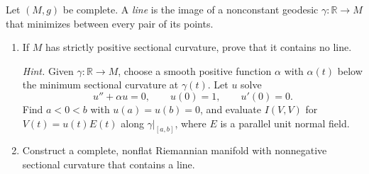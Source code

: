 \begin{exercise}
\label{prob:complete-lines-sectional-curvature}

Let $(M,g)$ be complete. A \emph{line} is the image of a nonconstant
geodesic $\gamma:\mathbb R\to M$ that minimizes between every pair of its
points.
\begin{enumerate}[label=(\alph*)]
\item If $M$ has strictly positive sectional curvature, prove that it
contains no line.

\emph{Hint.} Given $\gamma:\mathbb R\to M$, choose a smooth positive function
$\alpha$ with $\alpha(t)$ below the minimum sectional curvature at
$\gamma(t)$. Let $u$ solve
\[
u''+\alpha u=0,\qquad u(0)=1,\qquad u'(0)=0.
\]
Find $a<0<b$ with $u(a)=u(b)=0$, and evaluate $I(V,V)$ for
$V(t)=u(t)E(t)$ along $\gamma|_{[a,b]}$, where $E$ is a parallel unit normal
field.
\item Construct a complete, nonflat Riemannian manifold with nonnegative
sectional curvature that contains a line.
\end{enumerate}
\end{exercise}
